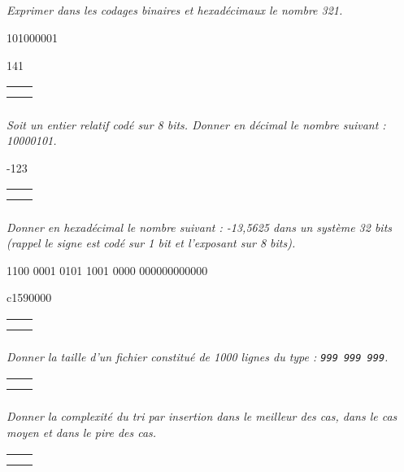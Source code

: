 \documentclass[10pt,fleqn]{article} %
\begin{document}

\vspace{2cm}
\pagestyle{fancy}
\thispagestyle{plain}

\subparagraph{}
\textit{Exprimer dans les codages binaires et hexadécimaux le nombre 321.}

\ifprof
\begin{corrige}
101000001

141
\end{corrige}
\else
\noindent\begin{tabular}{|p{\linewidth}|}
\hline
$$ \quad $$ \\
$$ \quad $$ \\
\hline
\end{tabular}
\fi
\subparagraph{}
\textit{Soit un entier relatif codé sur 8 bits. Donner en décimal le nombre suivant : 10000101.}

\ifprof
\begin{corrige}
-123
\end{corrige}
\else
\noindent\begin{tabular}{|p{\linewidth}|}
\hline
$$ \quad $$ \\
$$ \quad $$ \\
\hline
\end{tabular}
\fi

\subparagraph{}
\textit{Donner en hexadécimal le nombre suivant : -13,5625 dans un système 32 bits (rappel le signe est codé sur 1 bit et l'exposant sur 8 bits).}

\ifprof
\begin{corrige}
1100 0001 0101 1001 0000 000000000000

c1590000
\end{corrige}
\else
\noindent\begin{tabular}{|p{\linewidth}|}
\hline
$$ \quad $$ \\
$$ \quad $$ \\
\hline
\end{tabular}
\fi


\subparagraph{}
\textit{Donner la taille d'un fichier constitué de 1000 lignes du type : \texttt{999 999 999}.}

\ifprof
\begin{corrige}

\end{corrige}
\else
\noindent\begin{tabular}{|p{\linewidth}|}
\hline
$$ \quad $$ \\
$$ \quad $$ \\
\hline
\end{tabular}
\fi

\subparagraph{}
\textit{Donner la complexité du tri par insertion dans le meilleur des cas, dans le cas moyen et dans le pire des cas.}
\ifprof
\begin{corrige}

\end{corrige}
\else
\noindent\begin{tabular}{|p{\linewidth}|}
\hline
$$ \quad $$ \\
$$ \quad $$ \\
\hline
\end{tabular}
\fi
\end{document}
